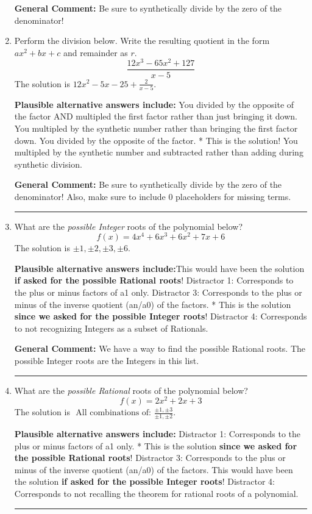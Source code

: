 \documentclass{extbook}[14pt]
\newcommand{\litem}[1]{\item #1

\rule{\textwidth}{0.4pt}}
\begin{document}
\begin{enumerate}
{\textbf{General Comment:} Be sure to synthetically divide by the zero of the denominator!
}
\litem{
Perform the division below. Write the resulting quotient in the form $ax^2+bx+c$ and remainder as $r$.
\[ \frac{12x^{3} -65 x^{2} + 127}{x -5} \]The solution is \( 12x^{2} -5 x -25 + \frac{2}{x -5} \).\begin{enumerate}[label=\Alph*.]
\textbf{Plausible alternative answers include:} You divided by the opposite of the factor AND multipled the first factor rather than just bringing it down.
 You multipled by the synthetic number rather than bringing the first factor down.
 You divided by the opposite of the factor.
* This is the solution!
 You multipled by the synthetic number and subtracted rather than adding during synthetic division.
\end{enumerate}

\textbf{General Comment:} Be sure to synthetically divide by the zero of the denominator! Also, make sure to include 0 placeholders for missing terms.
}
\litem{
What are the \textit{possible Integer} roots of the polynomial below?
\[ f(x) = 4x^{4} +6 x^{3} +6 x^{2} +7 x + 6 \]The solution is \( \pm 1,\pm 2,\pm 3,\pm 6 \).\begin{enumerate}[label=\Alph*.]
\textbf{Plausible alternative answers include:}This would have been the solution \textbf{if asked for the possible Rational roots}!
 Distractor 1: Corresponds to the plus or minus factors of a1 only.
 Distractor 3: Corresponds to the plus or minus of the inverse quotient (an/a0) of the factors. 
* This is the solution \textbf{since we asked for the possible Integer roots}!
 Distractor 4: Corresponds to not recognizing Integers as a subset of Rationals.
\end{enumerate}

\textbf{General Comment:} We have a way to find the possible Rational roots. The possible Integer roots are the Integers in this list.
}
\litem{
What are the \textit{possible Rational} roots of the polynomial below?
\[ f(x) = 2x^{2} +2 x + 3 \]The solution is \( \text{ All combinations of: }\frac{\pm 1,\pm 3}{\pm 1,\pm 2} \).\begin{enumerate}[label=\Alph*.]
\textbf{Plausible alternative answers include:} Distractor 1: Corresponds to the plus or minus factors of a1 only.
* This is the solution \textbf{since we asked for the possible Rational roots}!
 Distractor 3: Corresponds to the plus or minus of the inverse quotient (an/a0) of the factors. 
This would have been the solution \textbf{if asked for the possible Integer roots}!
 Distractor 4: Corresponds to not recalling the theorem for rational roots of a polynomial.
\end{enumerate}

}
\end{enumerate}
\end{document}
